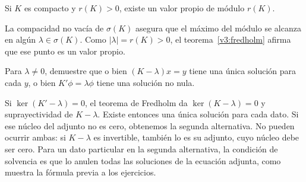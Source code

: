 \begin{ejercicio}\label{ej:v3-l10-2}
Si $K$ es compacto y $r(K)>0$, existe un valor propio de módulo $r(K)$.
\end{ejercicio}
\begin{solucion}
La compacidad no vacía de $\sigma(K)$ asegura que el máximo del módulo se alcanza en algún $\lambda\in\sigma(K)$. Como $|\lambda|=r(K)>0$, el teorema~\ref{v3:fredholm} afirma que ese punto es un valor propio.
\end{solucion}

\begin{ejercicio}\label{ej:v3-l10-3}
Para $\lambda\ne0$, demuestre que o bien $(K-\lambda)x=y$ tiene una única solución para cada $y$, o bien $K'\phi=\lambda\phi$ tiene una solución no nula.
\end{ejercicio}
\begin{solucion}
Si $\ker(K'-\lambda)=0$, el teorema de Fredholm da $\ker(K-\lambda)=0$ y suprayectividad de $K-\lambda$. Existe entonces una única solución para cada dato. Si ese núcleo del adjunto no es cero, obtenemos la segunda alternativa. No pueden ocurrir ambas: si $K-\lambda$ es invertible, también lo es su adjunto, cuyo núcleo debe ser cero. Para un dato particular en la segunda alternativa, la condición de solvencia es que lo anulen todas las soluciones de la ecuación adjunta, como muestra la fórmula previa a los ejercicios.
\end{solucion}


